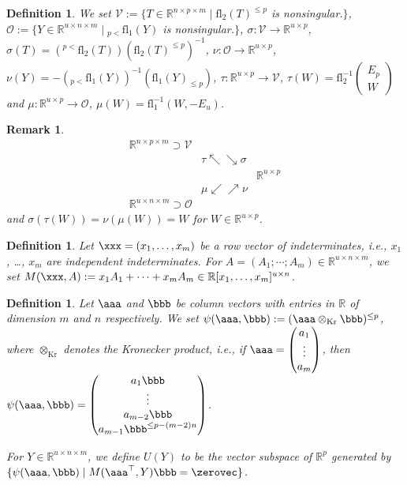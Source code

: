 \documentclass[a4paper,12pt]{article}
\newcommand{\RRR}{\mathbb{R}}
\newcommand{\msOOO}{\mathscr{O}}
\newcommand{\msVVV}{\mathscr{V}}
\newcommand{\define}{\mathrel{:=}}
\newcommand{\transpose}{^\top}
\newcommand\nonsing{nonsingular}
\newcommand\fl{\mathrm{fl}}
\newcommand\kprod{\otimes_\mathrm{Kr}}
\newtheorem{definition}[thm]{Definition}
\newtheorem{remark}[thm]{Remark}
\begin{document}
\begin{definition}\rm
\label{def:sigma nu}
We set
$\msVVV\define\{T\in\RRR^{n\times p\times m}\mid
\fl_2(T)^{\leq p}$ is \nonsing.$\}$,
$\msOOO\define\{Y\in\RRR^{u\times n\times m}\mid
{}_{p<}\fl_1(Y)$ is \nonsing.$\}$,
$\sigma\colon\msVVV\to\RRR^{u\times p}$,
$\sigma(T)=({}^{p<}\fl_2(T))(\fl_2(T)^{\leq p})^{-1}$,
$\nu\colon\msOOO\to\RRR^{u\times p}$,
$\nu(Y)=-({}_{p<}\fl_1(Y))^{-1}(\fl_1(Y)_{\leq p})$,
$\tau\colon\RRR^{u\times p}\to\msVVV$,
$\tau(W)=\fl_2^{-1}\begin{pmatrix}E_p\\ W\end{pmatrix}$
and
$\mu\colon\RRR^{u\times p}\to\msOOO$,
$\mu(W)=\fl_1^{-1}(W,-E_u)$.
\end{definition}
%
%
\begin{remark}\rm
$$
\begin{array}{lcr}
\RRR^{n\times p\times m}\supset\msVVV\\
&\!\!\!\!\!\!\!\!\!\!\tau\nwarrow\!\!\searrow\sigma\!\!\!\!\!\!\!\!\\
&&\RRR^{u\times p}\\
&\!\!\!\!\!\!\!\!\!\!\mu\swarrow\!\!\nearrow\nu\!\!\!\!\!\!\!\!\\
\RRR^{u\times n\times m}\supset\msOOO
\end{array}
$$
and
$\sigma(\tau(W))=\nu(\mu(W))=W$
for $W\in \RRR^{u\times p}$.
\end{remark}

\begin{definition}\rm
Let $\xxx=(x_1,\ldots,x_m)$ be a row vector of indeterminates,
i.e., $x_1$, \ldots, $x_m$ are independent indeterminates.
For $A=(A_1;\cdots;A_m)\in\RRR^{u\times n\times m}$,
we set $M(\xxx,A)\define x_1A_1+\cdots+x_mA_m\in \RRR[x_1, \ldots, x_m]^{u\times n}$.
\end{definition}


\begin{definition}\rm
Let $\aaa$ and $\bbb$ be column vectors with entries in $\RRR$ of 
dimension $m$ and $n$ respectively.
We set $\psi(\aaa,\bbb)\define(\aaa\kprod\bbb)^{\leq p}$,
where $\kprod$ denotes the Kronecker product, i.e.,
if $\aaa=\begin{pmatrix}a_1\\\vdots\\ a_m\end{pmatrix}$,
then
$\psi(\aaa,\bbb)=
\begin{pmatrix}a_1\bbb\\\vdots\\ a_{m-2}\bbb\\ a_{m-1}\bbb^{\leq p-(m-2)n}\end{pmatrix}$.

For $Y\in\RRR^{u\times n\times m}$, we define $U(Y)$ to be the vector
subspace of $\RRR^p$ generated by
$\{\psi(\aaa,\bbb)\mid M(\aaa\transpose,Y)\bbb=\zerovec\}$.
\end{definition}
\end{document}
